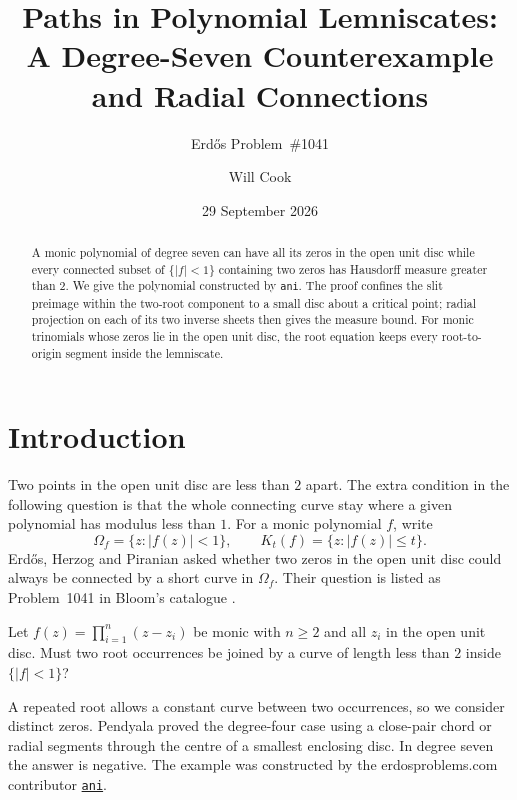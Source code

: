 \documentclass[11pt]{article}
\title{Paths in Polynomial Lemniscates:\\A Degree-Seven Counterexample\\and Radial Connections}
\subtitle{Erd\H{o}s Problem~\#1041}
\author{Will Cook}
\date{29 September 2026}
\begin{document}
\maketitle
\noteprovenance

\begin{abstract}
A monic polynomial of degree seven can have all its zeros in the open unit
disc while every connected subset of $\{|f|<1\}$ containing two zeros has
Hausdorff measure greater than $2$. We give the polynomial constructed by
\texttt{ani}. The proof confines the slit preimage within the two-root
component to a small disc about a critical point; radial projection on
each of its two inverse sheets then gives the measure bound. For monic
trinomials whose zeros lie in the open unit disc, the root equation
keeps every root-to-origin segment inside the lemniscate.
\end{abstract}

\section{Introduction}\label{sec:problem}

Two points in the open unit disc are less than $2$ apart. The extra
condition in the following question is that the whole connecting curve
stay where a given polynomial has modulus less than $1$.
For a monic polynomial $f$, write
\[
 \Omega_f=\{z:|f(z)|<1\},\qquad K_t(f)=\{z:|f(z)|\le t\}.
\]
Erd\H{o}s, Herzog and Piranian \cite[Problem~5, p.~139]{ehp1958} asked
whether two zeros in the open unit disc could always be connected by a
short curve in $\Omega_f$. Their question is listed as Problem~1041 in
Bloom's catalogue \cite{bloom}.

\begin{problem}[Erd\H{o}s \#1041]\label{res:problem}
Let $f(z)=\prod_{i=1}^{n}(z-z_i)$ be monic with $n\ge2$ and all
$z_i$ in the open unit disc.  Must two root occurrences be joined by a curve
of length less than $2$ inside $\{|f|<1\}$?
\end{problem}

A repeated root allows a constant curve between two occurrences, so we
consider distinct zeros. Pendyala
\cite[Theorem~1 and Lemma~1]{june2026} proved the degree-four case using
a close-pair chord or radial segments through the centre of a smallest
enclosing disc. In degree seven the answer is negative. The example was
constructed by the erdosproblems.com contributor
\href{https://www.erdosproblems.com/forum/thread/1041\#post-8861}{\texttt{ani}}.
\end{document}
